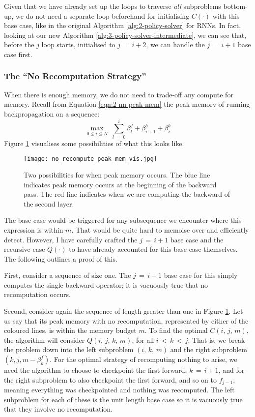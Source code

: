 Given that we have already set up the loops to traverse \textit{all} subproblems bottom-up, we do not need a separate loop beforehand for initialising \(C(\cdot)\) with this base case, like in the original Algorithm \ref{alg:2-policy-solver} for RNNs.
In fact, looking at our new Algorithm \ref{alg:3-policy-solver-intermediate}, we can see that, before the \(j\) loop starts, initialised to \(j\,=\,i+2\), we can handle the \(j\,=\,i+1\) base case first.

\subsubsection*{The ``No Recomputation Strategy''}
When there is enough memory, we do not need to trade-off any compute for memory.
Recall from Equation \ref{eqn:2-nn-peak-mem} the peak memory of running backpropagation on a sequence:
\begin{equation*}
    \max_{0 \leq i \leq N}\; \sum_{l\;=\;0}^i \beta^f_l + \beta^b_{i+1} + \beta^b_i
\end{equation*}
Figure \ref{fig:3-base-case-peak-mem} visualises some possibilities of what this looks like.

\begin{figure}[h]
    \centering
    \texttt{[image: no\_recompute\_peak\_mem\_vis.jpg]}
    \caption{Two possibilities for when peak memory occurs. The blue line indicates peak memory occurs at the beginning of the backward pass. The red line indicates when we are computing the backward of the second layer.}
    \label{fig:3-base-case-peak-mem}
\end{figure}

The base case would be triggered for any subsequence we encounter where this expression is within \(m\).
That would be quite hard to memoise over and efficiently detect.
However, I have carefully crafted the \(j\,=\,i+1\) base case and the recursive case \(Q(\cdot)\) to have already accounted for this base case themselves.
The following outlines a proof of this.

First, consider a sequence of size one.
The \(j\,=\,i+1\) base case for this simply computes the single backward operator; it is vacuously true that no recomputation occurs.

Second, consider again the sequence of length greater than one in Figure \ref{fig:3-base-case-peak-mem}.
Let us say that its peak memory with no recomputation, represented by either of the coloured lines, is within the memory budget \(m\).
To find the optimal \(C(i,\,j,\,m)\), the algorithm will consider \(Q(i,\,j,\,k,\,m)\), for all \(i \,<\, k \,<\, j\).
That is, we break the problem down into the left subproblem \((i,\,k,\,m)\) and the right subproblem \((k,j,m-\beta^f_k)\).
For the optimal strategy of recomputing nothing to arise, we need the algorithm to choose to checkpoint the first forward, \(k\,=\,i+1\), and for the right subproblem to also checkpoint the first forward, and so on to \(f_{j-1}\); meaning everything was checkpointed and nothing was recomputed.
The left subproblem for each of these is the unit length base case so it is vacuously true that they involve no recomputation.

